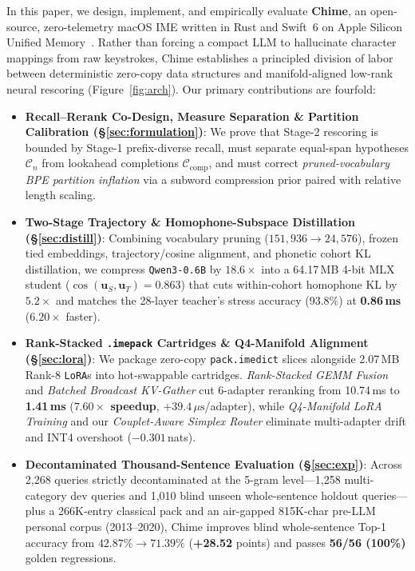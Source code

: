 \documentclass[10pt,twocolumn,letterpaper]{article}
\begin{document}
In this paper, we design, implement, and empirically evaluate \textbf{Chime}, an open-source, zero-telemetry macOS IME written in Rust and Swift~6 on Apple Silicon Unified Memory~\cite{hannun2023mlx}. Rather than forcing a compact LLM to hallucinate character mappings from raw keystrokes, Chime establishes a principled division of labor between deterministic zero-copy data structures and manifold-aligned low-rank neural rescoring (Figure~\ref{fig:arch}). Our primary contributions are fourfold:
\begin{itemize}
  \item \textbf{Recall--Rerank Co-Design, Measure Separation \& Partition Calibration (\S\ref{sec:formulation})}: We prove that Stage-2 rescoring is bounded by Stage-1 prefix-diverse recall, must separate equal-span hypotheses $\mathcal{C}_n$ from lookahead completions $\mathcal{C}_{\text{comp}}$, and must correct \emph{pruned-vocabulary BPE partition inflation} via a subword compression prior paired with relative length scaling.
  \item \textbf{Two-Stage Trajectory \& Homophone-Subspace Distillation (\S\ref{sec:distill})}: Combining vocabulary pruning ($151{,}936 \to 24{,}576$), frozen tied embeddings, trajectory/cosine alignment, and phonetic cohort KL distillation, we compress \texttt{Qwen3-0.6B} by $18.6\times$ into a 64.17\,MB 4-bit MLX student ($\cos(\bm{u}_S, \bm{u}_T) = 0.863$) that cuts within-cohort homophone KL by \textbf{$5.2\times$} and matches the 28-layer teacher's stress accuracy (93.8\%) at \textbf{0.86\,ms} ($6.20\times$ faster).
  \item \textbf{Rank-Stacked \texttt{.imepack} Cartridges \& Q4-Manifold Alignment (\S\ref{sec:lora})}: We package zero-copy \texttt{pack.imedict} slices alongside 2.07\,MB Rank-8 \texttt{LoRA}s into hot-swappable cartridges. \emph{Rank-Stacked GEMM Fusion} and \emph{Batched Broadcast KV-Gather} cut 6-adapter reranking from 10.74\,ms to \textbf{1.41\,ms} (\textbf{$7.60\times$ speedup}, $+39.4\,\mu\text{s}$/adapter), while \emph{Q4-Manifold LoRA Training} and our \emph{Couplet-Aware Simplex Router} eliminate multi-adapter drift and INT4 overshoot ($-0.301$\,nats).
  \item \textbf{Decontaminated Thousand-Sentence Evaluation (\S\ref{sec:exp})}: Across 2,268 queries strictly decontaminated at the 5-gram level---1,258 multi-category dev queries and 1,010 blind unseen whole-sentence holdout queries---plus a 266K-entry classical pack and an air-gapped 815K-char pre-LLM personal corpus (2013--2020), Chime improves blind whole-sentence Top-1 accuracy from $42.87\% \to \mathbf{71.39\%}$ (\textbf{+28.52} points) and passes \textbf{56/56 (100\%)} golden regressions.
\end{itemize}
\end{document}
